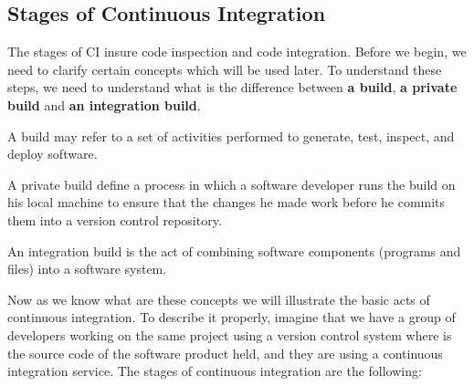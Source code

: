 \subsection{Stages of Continuous Integration}

The stages of CI insure code inspection and code integration. Before we begin, we need to clarify certain concepts which will be used later. To understand these steps, we need to understand what is the difference between \textbf{a build}, \textbf{a private build} and \textbf{an integration build}.

\begin{DEF}
A build may refer to a set of activities performed to generate, test, inspect, and deploy software\cite{CIPD}.
\end{DEF}

\begin{DEF}
A private build define a process in which a software developer runs the build on his local machine to ensure that the changes he made work before he commits them into a version control repository.
\end{DEF}

\begin{DEF}
An integration build is the act of combining software components (programs and files) into a software system\cite{CIPD}.
\end{DEF}

Now as we know what are these concepts we will illustrate the basic acts of continuous integration. To describe it properly, imagine that we have a group of developers working on the same project using a version control system where is the source code of the software product held, and they are using a continuous integration service. The stages of continuous integration are the following:

